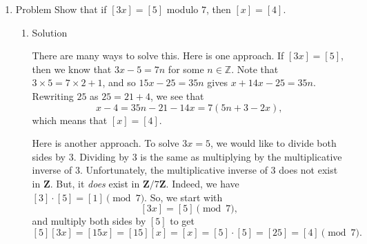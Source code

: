 \documentclass{amsart}
\begin{document}
\begin{enumerate}
\begin{enumerate}
\emph{Bonus (not to be turned in):} Can you find a pattern here? When does \([x]\) have a multiplicative inverse?  Does a number ever have more than one inverse?
\begin{enumerate}
\item Solution
\label{sec:org1266cdc}
There are \(10\) equivalence classes modulo \(d\), namely \([0], [1], \ldots, [9]\).
Note that
\begin{align*}
 [1] \cdot [1] &= [1], \\
 [3] \cdot [7] &= [1], \\
 [9] \cdot [9] &= [1]. 
\end{align*}
This gives multiplicative inverses of \([1], [3], [7],\) and \([9]\).
The other 6 elements, \([0], [2], [4], [5], [6]\), and \([8]\) do not have multiplicative inverses.
You can check this directly, or observe the following.
Take \([4]\), for example. 
The number 4 shares the prime factor 2 with 10.
If \([y]\) were a multiplicative inverse of \([4]\) modulo 10, then that means, \(4y-1\) is divisible by 10.
That is, \(4y-1 = 10n\) for some \(n \in \mathbf{Z}\).
But 2 divides both \(10n\) and \(4y\), but it does not divide \(1\).  This cannot happen.
Similarly, \([5]\) cannot have a multiplicative inverse because it shares the prime factor \(5\) with the modulus \(10\).
(If you write an analogous equation, you will get \(5y-1 = 10n\), which is impossible because \(5y\) and \(10n\) are both divisible by \(5\) but \(1\) is not.)

The pattern is that \([x]\) has a multiplicative inverse modulo \(d\) if and only if \(\gcd(x,d) = 1\), that is, if \(x\) and \(d\) do not share any common prime factors.
In that case, the multiplicative inverse is unique.
\end{enumerate}
\item Problem
\label{sec:org3f2f7c6}
Show that if \([3x] = [5]\) modulo \(7\), then \([x] = [4]\).
\begin{enumerate}
\item Solution
\label{sec:orgc723ab8}

There are many ways to solve this. 
Here is one approach.
If \([3x] = [5]\), then we know that \(3x - 5 = 7n\) for some \(n \in \mathbb{Z}\).
Note that \(3 \times 5 = 7\times 2 + 1\), and so \(15x - 25 = 35n\) gives \(x + 14x - 25 = 35n\).
Rewriting \(25\) as \(25 = 21 + 4\), we see that
\[x - 4 = 35n - 21 - 14x = 7(5n +3 - 2x),\]
which means that \([x] = [4]\).

Here is another approach.
To solve \(3x = 5\), we would like to divide both sides by \(3\).
Dividing by \(3\) is the same as multiplying by the multiplicative inverse of \(3\).
Unfortunately, the multiplicative inverse of 3 does not exist in \(\mathbf{Z}\).
But, it \emph{does} exist in \(\mathbf{Z}/7 \mathbf{Z}\).
Indeed, we have \([3] \cdot [5] = [1] \pmod 7\).
So, we start with
\[ [3x] = [5] \pmod 7,\]
and multiply both sides by \([5]\) to get
\[ [5][3x] = [15x] = [15][x] = [x] = [5] \cdot [5] = [25] = [4] \pmod 7.\]


\end{enumerate}
\end{enumerate}
\end{enumerate}
\end{document}
